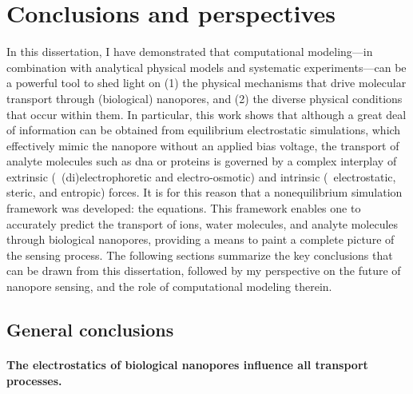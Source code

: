 \chapter{Conclusions and perspectives}
%
\label{ch:conclusion}
%

%
%


In this dissertation, I have demonstrated that computational modeling---in combination with analytical
physical models and systematic experiments---can be a powerful tool to shed light on (1) the physical
mechanisms that drive molecular transport through (biological) nanopores, and (2) the diverse physical
conditions that occur within them. In particular, this work shows that although a great deal of information
can be obtained from equilibrium electrostatic simulations, which effectively mimic the nanopore without an
applied bias voltage, the transport of analyte molecules such as \gls{dna} or proteins is governed by a
complex interplay of extrinsic (\ie~(di)electrophoretic and electro-osmotic) and intrinsic (\ie~electrostatic,
steric, and entropic) forces. It is for this reason that a nonequilibrium simulation framework was developed:
the  equations. This framework enables one to accurately predict the transport of ions,
water molecules, and analyte molecules through biological nanopores, providing a means to paint a complete
picture of the sensing process. The following sections summarize the key conclusions that can be drawn from
this dissertation, followed by my perspective on the future of nanopore sensing, and the role of computational
modeling therein.


%
\section{General conclusions}
%
\label{sec:con:conclusions}
%



\subsubsection{The electrostatics of biological nanopores influence all transport processes.}
%

